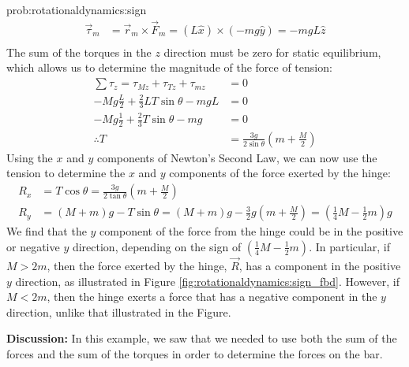 \begin{solution}{prob:rotationaldynamics:sign}
\begin{align*}
\vec \tau_m &= \vec r_m \times \vec F_m = (L\hat x) \times (-mg \hat y) =-mgL\hat z\\
\end{align*}
The sum of the torques in the $z$ direction must be zero for static equilibrium, which allows us to determine the magnitude of the force of tension:
\begin{align*}
\sum \tau_z = \tau_{Mz} + \tau_{Tz}+ \tau_{mz} &=0\\
-Mg\frac{L}{2} + \frac{2}{3}LT\sin\theta -mgL &=0\\
-Mg\frac{1}{2} + \frac{2}{3}T\sin\theta -mg &=0\\
\therefore T&= \frac{3g}{2\sin\theta} \left( m + \frac{M}{2}\right)
\end{align*}
Using the $x$ and $y$ components of Newton's Second Law, we can now use the tension to determine the $x$ and $y$ components of the force exerted by the hinge:
\begin{align*}
R_x &= T\cos\theta = \frac{3g}{2\tan\theta} \left( m + \frac{M}{2}\right)\\
R_y &= (M+m)g - T\sin\theta = (M+m)g - \frac{3}{2}g \left( m + \frac{M}{2}\right)=  \left( \frac{1}{4}M-\frac{1}{2}m\right)g
\end{align*}
We find that the $y$ component of the force from the hinge could be in the positive or negative $y$ direction, depending on the sign of $\left( \frac{1}{4}M-\frac{1}{2}m\right)$. In particular, if $M>2m$, then the force exerted by the hinge, $\vec R$, has a component in the positive $y$ direction, as illustrated in Figure \ref{fig:rotationaldynamics:sign_fbd}. However, if $M<2m$, then the hinge exerts a force that has a negative component in the $y$ direction, unlike that illustrated in the Figure. 

\textbf{Discussion: }In this example, we saw that we needed to use both the sum of the forces and the sum of the torques in order to determine the forces on the bar. 
\end{solution}







